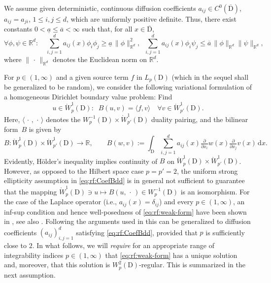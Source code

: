 \documentclass[reqno]{amsart}
\numberwithin{equation}{section}
\newcommand{\bbR}{\mathbb{R}}
\newcommand{\norm}[2]{     \| #1       \|_{ #2 }}
\newcommand{\duality}[1]{     \langle #1       \rangle}
\newcommand{\rd}{\mathrm{d}}
\newcommand{\dom}{\mathrm{D}}
\newcommand{\Wo}{\mathring{W}}
\newcommand{\from}{\colon}
\theoremstyle{remark}
\theoremstyle{definition}
\begin{document}
We assume given deterministic,  
continuous diffusion coefficients
$a_{ij}\in C^0(\overline{\dom})$, 
$a_{ij} =a_{ji}$, $1\leq i,j\leq d$,  
which are uniformly positive definite. 
Thus, there exist constants 
$0< \underline{a} \leq \overline{a} < \infty$ 
such that, for all $x\in \overline{\dom}$, 
%
\begin{equation}\label{eq:rf:CoefBdd}
\forall \phi,\psi \in \bbR^d: 
\quad 
\sum\limits_{i,j=1}^d a_{ij}(x)\phi_i \phi_j 
\geq 
\underline{a} \, \norm{ \phi }{\bbR^d}^2 ,  
\;\;   
\sum\limits_{i,j=1}^d a_{ij}(x)\phi_i \psi_j 
\leq 
\overline{a} \, \norm{ \phi }{\bbR^d} \norm{ \psi }{\bbR^d}
, 
\end{equation}
%
where $\norm{ \,\cdot\, }{\bbR^d}$ denotes 
the Euclidean norm on $\bbR^d$. 

For $p\in(1,\infty)$ and a given 
source term $f$ in $L_p(\dom)$ 
(which in the sequel shall be generalized to be random), 
we consider the following 
variational formulation of a homogeneous 
Dirichlet boundary value problem: 
Find  
%
\begin{equation}\label{eq:rf:weak-form} 
u\in \Wo^1_p(\dom):
\;\;  
B(u,v) = \duality{ f,v }  
\quad 
\forall v\in  \Wo^1_{p'}(\dom). 
\end{equation}
%
Here, $\duality{ \,\cdot\,, \,\cdot\, }$ denotes 
the $W^{-1}_p(\dom)\times \Wo^1_{p'}(\dom)$ duality pairing,
and 
the bilinear form~$B$ 
is given by 
%
\[ 
B\from \Wo^1_p(\dom) \times \Wo^1_{p'}(\dom)\to \bbR, 
\qquad 
B(w,v) 
:= 
\int_{\dom} \sum_{i,j = 1}^d 
a_{ij}(x) 
\tfrac{\partial }{\partial x_i} w(x) 
\tfrac{\partial }{\partial x_j} v(x) \,\rd x . 
\] 
%
Evidently, 
H\"older's inequality implies continuity 
of $B$ on $\Wo^1_p(\dom) \times \Wo^1_{p'}(\dom)$. 
%
However, as opposed to the Hilbert space 
case $p=p'=2$, the 
uniform strong ellipticity assumption  
in \eqref{eq:rf:CoefBdd} 
is in general not sufficient to guarantee   
that the mapping 
$\Wo^1_p(\dom) \ni u \mapsto B(u,\,\cdot\,) \in W^{-1}_p(\dom)$ 
is an isomorphism. 
For the case of the Laplace operator 
(i.e., $a_{ij}(x) = \delta_{ij}$)
and every $p\in(1,\infty)$, 
an inf-sup condition and 
hence well-posedness of \eqref{eq:rf:weak-form} 
have been shown in \cite[Theorem~6.1]{Simader1972}, 
see also \cite[Equation~(8.6.5)]{BrennerScott3rdEd}. 
Following the arguments 
used in \cite[Section~8.6]{BrennerScott3rdEd} 
this can be generalized to 
diffusion coefficients $(a_{ij})_{i,j=1}^d$ 
satisfying \eqref{eq:rf:CoefBdd}, 
provided that $p$ is sufficiently close to $2$. 
In what follows, we will \emph{require} 
for an appropriate range of 
integrability indices $p\in(1,\infty)$ that 
\eqref{eq:rf:weak-form} has a unique solution 
and, moreover, that this solution 
is $W^2_p(\dom)$-regular. 
%
This is summarized in the next  
assumption. 
\end{document}
